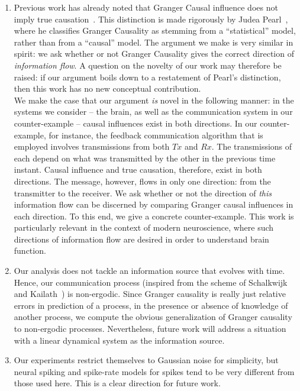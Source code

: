 \documentclass[letterpaper, 10pt, conference]{ieeeconf}
\begin{document}
\begin{enumerate}
	\item \label{remark:gc-vs-true} Previous work has already noted that Granger Causal influence does not imply true causation~\cite{granger1980testing}. This distinction is made rigorously by Judea Pearl~\cite{pearl2009causality-gc-stat}, where he classifies Granger Causality as stemming from a ``statistical'' model, rather than from a ``causal'' model. The argument we make is very similar in spirit: we ask whether or not Granger Causality gives the correct direction of \emph{information flow}. A question on the novelty of our work may therefore be raised: if our argument boils down to a restatement of Pearl's distinction, then this work has no new conceptual contribution. \\
		We make the case that our argument \emph{is} novel in the following manner: in the systems we consider -- the brain, as well as the communication system in our counter-example -- causal influences exist in both directions. In our counter-example, for instance, the feedback communication algorithm that is employed involves transmissions from both $Tx$ and $Rx$. The transmissions of each depend on what was transmitted by the other in the previous time instant. Causal influence and true causation, therefore, exist in both directions. The message, however, flows in only one direction: from the transmitter to the receiver. We ask whether or not the direction of \emph{this} information flow can be discerned by comparing Granger causal influences in each direction. To this end, we give a concrete counter-example. This work is particularly relevant in the context of modern neuroscience, where such directions of information flow are desired in order to understand brain function.
	\item Our analysis does not tackle an information source that evolves with time. Hence, our communication process (inspired from the scheme of Schalkwijk and Kailath~\cite{S&K}) is non-ergodic. Since Granger causality is really just relative errors in prediction of a process, in the presence or absence of knowledge of another process, we compute the obvious generalization of Granger causality to non-ergodic processes. Nevertheless, future work will address a situation with a linear dynamical system as the information source.
	\item Our experiments restrict themselves to Gaussian noise for simplicity, but neural spiking and spike-rate models for spikes tend to be very different from those used here. This is a clear direction for future work.

\end{enumerate}
\end{document}
